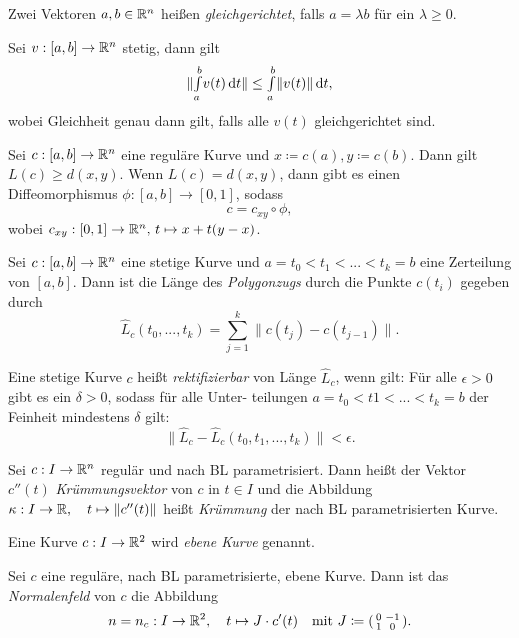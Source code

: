 \documentclass{cheat-sheet}
\newcommand{\Intabdt}[1]{\Int{a}{b}{#1}{t}}
\begin{document}
\begin{defn}
  Zwei Vektoren $a, b \in \mathbb{R}^n$ heißen \emph{gleichgerichtet}, falls $a = \lambda b$ für ein $\lambda \geq 0$.
\end{defn}

\begin{satz}
  Sei $v : [a, b] \to \mathbb{R}^n$ stetig, dann gilt
  \[ \| \Intabdt{v(t)} \| \leq \Intabdt{\|v(t)\|}, \]
  wobei Gleichheit genau dann gilt, falls alle $v(t)$ gleichgerichtet sind.
\end{satz}

\begin{satz}
  Sei $c : [a, b] \to \mathbb{R}^n$ eine reguläre Kurve und $x \coloneqq c(a), y \coloneqq c(b)$. Dann gilt $L(c) \geq d(x, y)$. Wenn $L(c) = d(x, y)$, dann gibt es einen Diffeomorphismus $\phi : [a, b] \to [0, 1]$, sodass
  \[ c = c_{xy} \circ \phi, \]
  wobei $c_{xy} : [0, 1] \to \mathbb{R}^n,\,t \mapsto x + t (y - x)$.
\end{satz}


\begin{defn}
  Sei $c : [a, b] \to \mathbb{R}^n$ eine stetige Kurve und $a = t_0 < t_1 < ... < t_k = b$ eine Zerteilung von $[a, b]$. Dann ist die Länge des \emph{Polygonzugs} durch die Punkte $c(t_i)$ gegeben durch
  \[ \hat{L}_c(t_0, ..., t_k) = \sum_{j=1}^k \| c(t_j) - c(t_{j-1}) \|. \]
\end{defn}

\begin{defn}
  Eine stetige Kurve $c$ heißt \emph{rektifizierbar} von Länge $\hat{L}_c$, wenn gilt: Für alle $\epsilon > 0$ gibt es ein $\delta > 0$, sodass für alle Unter- teilungen $a = t_0 < t1 < ... < t_k = b$ der Feinheit mindestens $\delta$ gilt:
  \[ \| \hat{L}_c - \hat{L}_c(t_0, t_1, ..., t_k) \| < \epsilon. \]
\end{defn}

\begin{defn}
  Sei $c : I \to \mathbb{R}^n$ regulär und nach BL parametrisiert. Dann heißt der Vektor $c''(t)$ \emph{Krümmungsvektor} von $c$ in $t \in I$ und die Abbildung $\kappa : I \to \mathbb{R}, \quad t \mapsto \| c''(t) \|$ heißt \emph{Krümmung} der nach BL parametrisierten Kurve.
\end{defn}

\begin{defn}
  Eine Kurve $c : I \to \mathbb{R}^2$ wird \emph{ebene Kurve} genannt.
\end{defn}

\begin{defn}
  Sei $c$ eine reguläre, nach BL parametrisierte, ebene Kurve. Dann ist das \emph{Normalenfeld} von $c$ die Abbildung
  \[ n = n_c : I \to \mathbb{R}^2, \quad t \mapsto J \cdot c'(t) \quad \text{mit } J \coloneqq (\begin{smallmatrix} 0 & -1 \\ 1 & 0 \end{smallmatrix}).  \]
  
\end{defn}
\end{document}
